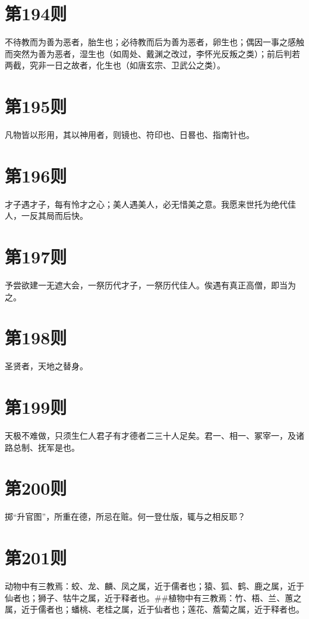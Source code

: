 \documentclass[12pt,a4paper]{ctexbook}
\begin{document}
\section{第194则}
不待教而为善为恶者，胎生也；必待教而后为善为恶者，卵生也；偶因一事之感触而突然为善为恶者，湿生也（如周处、戴渊之改过，李怀光反叛之类）；前后判若两截，究非一日之故者，化生也（如唐玄宗、卫武公之类）。\par

\section{第195则}
凡物皆以形用，其以神用者，则镜也、符印也、日晷也、指南针也。\par

\section{第196则}
才子遇才子，每有怜才之心；美人遇美人，必无惜美之意。我愿来世托为绝代佳人，一反其局而后快。\par

\section{第197则}
予尝欲建一无遮大会，一祭历代才子，一祭历代佳人。俟遇有真正高僧，即当为之。\par

\section{第198则}
圣贤者，天地之替身。\par

\section{第199则}
天极不难做，只须生仁人君子有才德者二三十人足矣。君一、相一、冢宰一，及诸路总制、抚军是也。\par

\section{第200则}
掷“升官图”，所重在德，所忌在赃。何一登仕版，辄与之相反耶？\par

\section{第201则}
动物中有三教焉：蛟、龙、麟、凤之属，近于儒者也；猿、狐、鹤、鹿之属，近于仙者也；狮子、牯牛之属，近于释者也。\#\#植物中有三教焉：竹、梧、兰、蕙之属，近于儒者也；蟠桃、老桂之属，近于仙者也；莲花、薝蔔之属，近于释者也。\par
\end{document}
